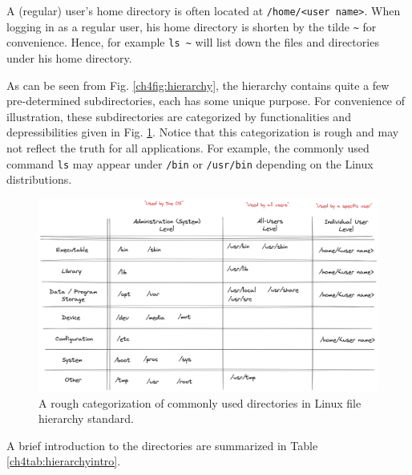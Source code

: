 A (regular) user's home directory is often located at \verb|/home/<user name>|. When logging in as a regular user, his home directory is shorten by the tilde \verb|~| for convenience. Hence, for example \verb|ls ~| will list down the files and directories under his home directory.

As can be seen from Fig. \ref{ch4fig:hierarchy}, the hierarchy contains quite a few pre-determined subdirectories, each has some unique purpose. For convenience of illustration, these subdirectories are categorized by functionalities and depressibilities given in Fig. \ref{ch4fig:directorycate}. Notice that this categorization is rough and may not reflect the truth for all applications. For example, the commonly used command \verb|ls| may appear under \verb|/bin| or \verb|/usr/bin| depending on the Linux distributions.

\begin{figure}
	\centering
	\includegraphics[width=350pt]{chapters/chapter4/figures/linux_directory_cate.png}
	\caption{A rough categorization of commonly used directories in Linux file hierarchy standard.} \label{ch4fig:directorycate}
\end{figure}

A brief introduction to the directories are summarized in Table \ref{ch4tab:hierarchyintro}.

